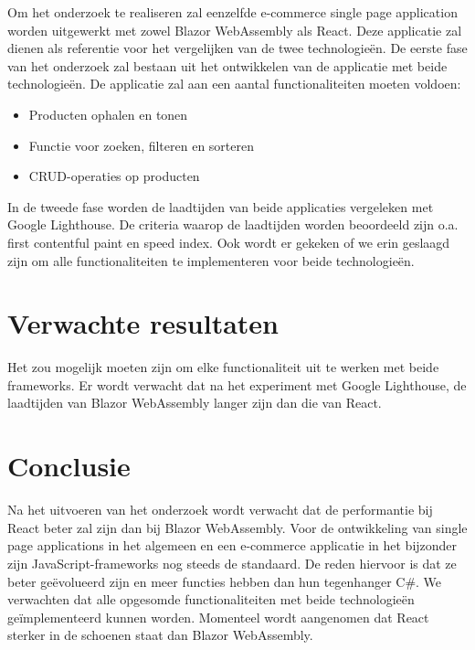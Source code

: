 \documentclass{hogent-article}
\begin{document}
Om het onderzoek te realiseren zal eenzelfde e-commerce single page application worden uitgewerkt met zowel Blazor WebAssembly als React. Deze applicatie zal dienen als referentie voor het vergelijken van de twee technologieën.
\newline\newline
De eerste fase van het onderzoek zal bestaan uit het ontwikkelen van de applicatie met beide technologieën. De applicatie zal aan een aantal functionaliteiten moeten voldoen:

\begin{itemize}
    \item Producten ophalen en tonen
    \item Functie voor zoeken, filteren en sorteren
    \item CRUD-operaties op producten
\end{itemize}

In de tweede fase worden de laadtijden van beide applicaties vergeleken met Google Lighthouse. De criteria waarop de laadtijden worden beoordeeld zijn o.a. first contentful paint en speed index. Ook wordt er gekeken of we erin geslaagd zijn om alle functionaliteiten te implementeren voor beide technologieën.

\section{Verwachte resultaten}%
\label{sec:verwachte-resultaten}


Het zou mogelijk moeten zijn om elke functionaliteit uit te werken met beide frameworks. Er wordt verwacht dat na het experiment met Google Lighthouse, de laadtijden van Blazor WebAssembly langer zijn dan die van React.

\section{Conclusie}%
\label{sec:discussie-conclusie}

Na het uitvoeren van het onderzoek wordt verwacht dat de performantie bij React beter zal zijn dan bij Blazor WebAssembly. Voor de ontwikkeling van single page applications in het algemeen en een e-commerce applicatie in het bijzonder zijn JavaScript-frameworks nog steeds de standaard. De reden hiervoor is dat ze beter geëvolueerd zijn en meer functies hebben dan hun tegenhanger C\#. We verwachten dat alle opgesomde functionaliteiten met beide technologieën geïmplementeerd kunnen worden. Momenteel wordt aangenomen dat React sterker in de schoenen staat dan Blazor WebAssembly.
\end{document}
